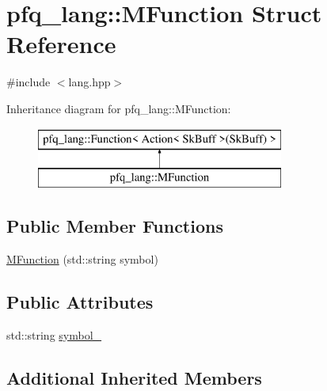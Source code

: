 \hypertarget{structpfq__lang_1_1MFunction}{\section{pfq\+\_\+lang\+:\+:M\+Function Struct Reference}
\label{structpfq__lang_1_1MFunction}
}


{\ttfamily \#include $<$lang.\+hpp$>$}

Inheritance diagram for pfq\+\_\+lang\+:\+:M\+Function\+:\begin{figure}[H]
\begin{center}
\leavevmode
\includegraphics[height=2.000000cm]{structpfq__lang_1_1MFunction}
\end{center}
\end{figure}
\subsection*{Public Member Functions}
\begin{DoxyCompactItemize}
\item 
\hyperlink{structpfq__lang_1_1MFunction_a0903ea045763e5516cbdab8b724ff644}{M\+Function} (std\+::string symbol)
\end{DoxyCompactItemize}
\subsection*{Public Attributes}
\begin{DoxyCompactItemize}
\item 
std\+::string \hyperlink{structpfq__lang_1_1MFunction_af161111a9d2ffbd56bc44ec58a5bbce4}{symbol\+\_\+}
\end{DoxyCompactItemize}
\subsection*{Additional Inherited Members}


